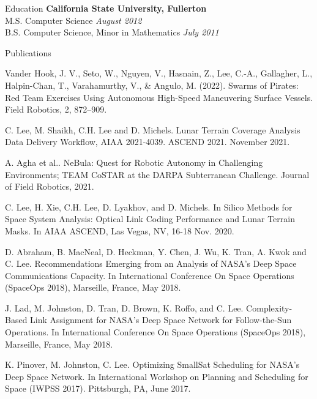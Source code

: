 \documentclass{resume} %
\begin{document}
\begin{rSection}{Education}
{\bf California State University, Fullerton}  \\ 
M.S. Computer Science \hfill {\em August 2012}\\
B.S. Computer Science, Minor in Mathematics  \hfill {\em July 2011}\\
\end{rSection}


\begin{rSection}{Publications}
\item Vander Hook, J. V., Seto, W., Nguyen, V., Hasnain, Z., Lee, C.-A., Gallagher,
L., Halpin-Chan, T., Varahamurthy, V., \& Angulo, M. (2022). Swarms of Pirates: Red Team Exercises Using
Autonomous High-Speed Maneuvering Surface Vessels. Field Robotics, 2, 872–909.

\item C. Lee, M. Shaikh, C.H. Lee and D. Michels. Lunar Terrain Coverage Analysis Data Delivery Workflow, AIAA 2021-4039. ASCEND 2021. November 2021.

\item A. Agha et al.. NeBula: Quest for Robotic Autonomy in Challenging Environments; TEAM CoSTAR at the DARPA Subterranean Challenge. Journal of Field Robotics, 2021.

\item C. Lee, H. Xie, C.H. Lee, D. Lyakhov, and D. Michels. In Silico Methods for Space System Analysis: Optical Link Coding Performance and Lunar Terrain Masks. In AIAA ASCEND, Las Vegas, NV, 16-18 Nov. 2020.

\item D. Abraham, B. MacNeal, D. Heckman, Y. Chen, J. Wu, K. Tran, A. Kwok and C. Lee. Recommendations Emerging from an Analysis of NASA’s Deep Space Communications Capacity. In International Conference On Space Operations (SpaceOps 2018), Marseille, France, May 2018. 


\item J. Lad, M. Johnston, D. Tran, D. Brown, K. Roffo, and C. Lee. Complexity-Based Link Assignment for NASA’s Deep Space Network for Follow-the-Sun Operations. In International Conference On Space Operations (SpaceOps 2018), Marseille, France, May 2018. 

\item K. Pinover, M. Johnston, C. Lee. Optimizing SmallSat Scheduling for NASA’s Deep Space Network. In International Workshop on Planning and Scheduling for Space (IWPSS 2017). Pittsburgh, PA, June 2017. 



\end{rSection}
\end{document}
